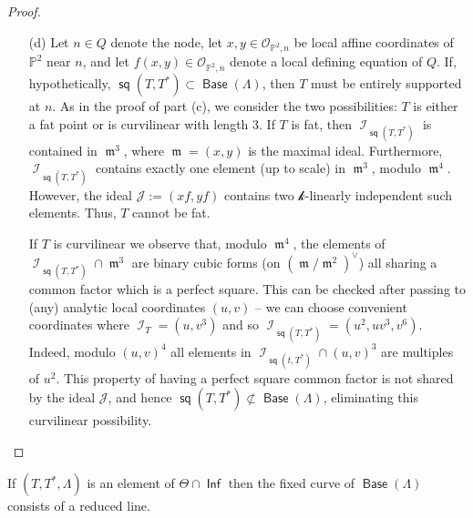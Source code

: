 \documentclass{article}
\renewcommand{\P}{\mathbb{P}}
\renewcommand{\k}{\mathscr{k}}
\DeclareMathOperator{\I}{\mathcal{I}}
\renewcommand{\O}{\mathcal{O}}
\DeclareMathOperator{\s}{\mathsf{sq}}
\DeclareMathOperator{\Inf}{\mathsf{Inf}}
\DeclareMathOperator{\Base}{\mathsf{Base}}
\DeclareMathOperator{\m}{\mathfrak{m}}
\begin{document}
\begin{proof}
\begin{enumerate}
        On the other hand, if $T$ is curvilinear a calculation as in the proof of part (b) implies that, modulo $\m^{3}$, $\I_{\s(T,T^{*})} \cap \m^{2}$ consists of a single quadratic form on $(\m/\m^{2})^{\vee}$ up to scaling. However, $\mathcal{J} \cap \m^{2}$ has two linearly independent quadratic forms modulo $\m^{3}$, and thus again $\s(T,T^{*}) \not\subset \Base (\Lambda)$. So our hypothetical situation is impossible, as we needed to show.

        \item[(d)] Let $n \in Q$ denote the node, let $x,y \in \O_{\P^{2},n}$ be local affine coordinates of $\P^{2}$ near $n$, and let $f(x,y) \in \O_{\P^{2},n}$ denote a local defining equation of $Q$.  If, hypothetically, $\s(T,T^{*}) \subset \Base (\Lambda)$, then $T$ must be entirely supported at $n$.  As in the proof of part (c), we consider the two possibilities: $T$ is either a fat point or is curvilinear with length $3$.  If $T$ is fat, then $\I_{\s(T,T^{*})}$ is contained in $\m^{3}$, where $\m = (x,y)$ is the maximal ideal. Furthermore, $\I_{\s(T,T^{*})}$ contains exactly one element (up to scale) in $\m^{3}$, modulo $\m^{4}$. However, the ideal $\mathcal{J} := (xf,yf)$ contains two $\k$-linearly independent such elements. Thus, $T$ cannot be fat.  

        If $T$ is curvilinear we observe that, modulo $\m^{4}$, the elements of $\I_{\s(T,T^{*})} \cap \m^{3}$ are binary cubic forms (on $(\m/\m^{2})^{\vee}$) all sharing a common factor which is a perfect square. This can be checked after passing to (any) analytic local coordinates $(u,v)$ -- we can choose convenient coordinates where $\I_{T} = (u,v^{3})$ and so $\I_{\s(T,T^{*})} = (u^2, uv^3,v^6)$.  Indeed, modulo $(u,v)^4$ all elements in $\I_{\s(t,T^{*})} \cap (u,v)^{3}$  are multiples of $u^{2}$.  This property of having a perfect square common factor is not shared by the ideal $\mathcal{J}$, and hence $\s(T,T^*) \not\subset \Base (\Lambda)$, eliminating this curvilinear possibility.
        \end{enumerate}
\end{proof}



\begin{proposition}
  \label{proposition:infline} If $(T,T^{*},\Lambda)$  is an element of $\Theta \cap \Inf$ then
  the fixed curve of $\Base(\Lambda)$ consists of a reduced
  line.
\end{proposition}
\end{document}
